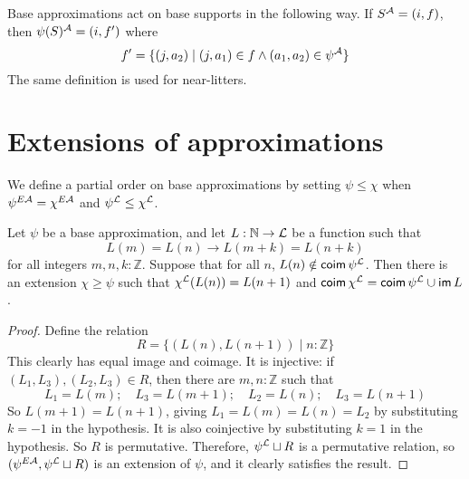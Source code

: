 \begin{definition}
  \label{def:smulApproxSupport}
  Base approximations act on base supports in the following way.
  If \( S^{\mathcal A} = (i, f) \), then \( \psi(S)^{\mathcal A} = (i, f') \) where
  \[ f' = \{ (j, a_2) \mid (j, a_1) \in f \wedge (a_1, a_2) \in \psi^{\mathcal A} \} \]
  The same definition is used for near-litters.
\end{definition}

\section{Extensions of approximations}
\begin{definition}
  \label{def:BaseApprox.LE}
  We define a partial order on base approximations by setting \( \psi \leq \chi \) when \( \psi^{E{\mathcal A}} = \chi^{E{\mathcal A}} \) and \( \psi^{\mathcal L} \leq \chi^{\mathcal L} \).
\end{definition}
\begin{proposition}
  \label{prop:BaseApprox.addOrbit}
  Let \( \psi \) be a base approximation, and let \( L : \mathbb N \to {\mathcal L} \) be a function such that
  \[ L(m) = L(n) \to L(m+k) = L(n+k) \]
  for all integers \( m, n, k : \mathbb Z \).
  Suppose that for all \( n \), \( L(n) \notin \operatorname{\mathsf{coim}} \psi^{\mathcal L} \).
  Then there is an extension \( \chi \geq \psi \) such that \( \chi^{\mathcal L}(L(n)) = L(n+1) \) and \( \operatorname{\mathsf{coim}} \chi^{\mathcal L} = \operatorname{\mathsf{coim}} \psi^{\mathcal L} \cup \operatorname{\mathsf{im}} L \).
\end{proposition}
\begin{proof}
  Define the relation
  \[ R = \{ (L(n), L(n+1)) \mid n : \mathbb Z \} \]
  This clearly has equal image and coimage.
  It is injective: if \( (L_1, L_3), (L_2, L_3) \in R \), then there are \( m, n : \mathbb Z \) such that
  \[ L_1 = L(m);\quad L_3 = L(m + 1);\quad L_2 = L(n);\quad L_3 = L(n + 1) \]
  So \( L(m + 1) = L(n + 1) \), giving \( L_1 = L(m) = L(n) = L_2 \) by substituting \( k = -1 \) in the hypothesis.
  It is also coinjective by substituting \( k = 1 \) in the hypothesis.
  So \( R \) is permutative.
  Therefore, \( \psi^{\mathcal L} \sqcup R \) is a permutative relation, so \( (\psi^{E{\mathcal A}}, \psi^{\mathcal L} \sqcup R) \) is an extension of \( \psi \), and it clearly satisfies the result.
\end{proof}

